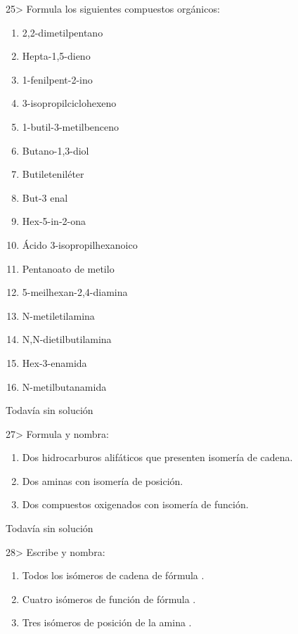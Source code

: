 \documentclass{article}
\begin{document}
\begin{exercise}
  25> Formula los siguientes compuestos orgánicos:
  \begin{enumerate}
    \item 2,2-dimetilpentano
    \item Hepta-1,5-dieno
    \item 1-fenilpent-2-ino
    \item 3-isopropilciclohexeno
    \item 1-butil-3-metilbenceno
    \item Butano-1,3-diol
    \item Butileteniléter
    \item But-3 enal
    \item Hex-5-in-2-ona
    \item Ácido 3-isopropilhexanoico
    \item Pentanoato de metilo
    \item 5-meilhexan-2,4-diamina
    \item N-metiletilamina
    \item N,N-dietilbutilamina
    \item Hex-3-enamida
    \item N-metilbutanamida
  \end{enumerate}
\end{exercise}

\begin{solution}[print=false]
  Todavía sin solución
\end{solution}

\begin{exercise}
  27> Formula y nombra:
  \begin{enumerate}
    \item Dos hidrocarburos alifáticos que presenten isomería de cadena.
    \item Dos aminas con isomería de posición.
    \item Dos compuestos oxigenados con isomería de función.
  \end{enumerate}
\end{exercise}

\begin{solution}[print=false]
  Todavía sin solución
\end{solution}

\begin{exercise}
  28> Escribe y nombra:
  \begin{enumerate}
    \item Todos los isómeros de cadena de fórmula .
    \item Cuatro isómeros de función de fórmula .
    \item Tres isómeros de posición de la amina .
  \end{enumerate}
\end{exercise}
\end{document}
